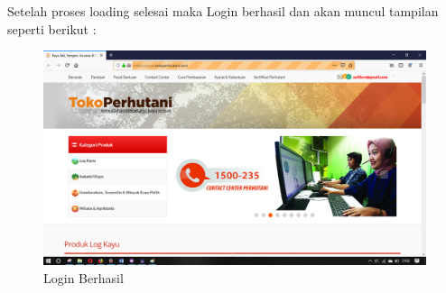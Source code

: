 Setelah proses loading selesai maka Login berhasil dan akan muncul tampilan seperti berikut :
\begin{figure}[h]
 	\centering
 	\includegraphics[scale=0.20]{figures/2login}
 	\caption{Login Berhasil}
\end{figure}

